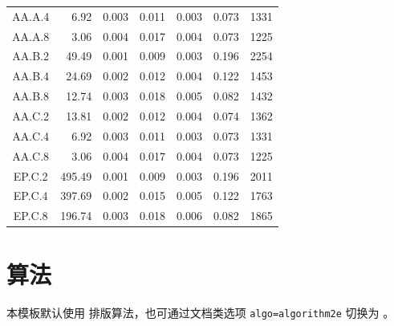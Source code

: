 \begin{ThreePartTable}
\begin{longtable}[c]{@{\extracolsep{\fill}}c*{6}{r}}
    AA.A.4                 & 6.92                                & 0.003                               & 0.011          & 0.003 & 0.073 & 1331   \\
    AA.A.8                 & 3.06                                & 0.004                               & 0.017          & 0.004 & 0.073 & 1225   \\
    AA.B.2                 & 49.49                               & 0.001                               & 0.009          & 0.003 & 0.196 & 2254   \\
    AA.B.4                 & 24.69                               & 0.002                               & 0.012          & 0.004 & 0.122 & 1453   \\
    AA.B.8                 & 12.74                               & 0.003                               & 0.018          & 0.005 & 0.082 & 1432   \\
    AA.C.2                 & 13.81                               & 0.002                               & 0.012          & 0.004 & 0.074 & 1362   \\
    AA.C.4                 & 6.92                                & 0.003                               & 0.011          & 0.003 & 0.073 & 1331   \\
    AA.C.8                 & 3.06                                & 0.004                               & 0.017          & 0.004 & 0.073 & 1225   \\
    EP.C.2                 & 495.49                              & 0.001                               & 0.009          & 0.003 & 0.196 & 2011   \\
    EP.C.4                 & 397.69                              & 0.002                               & 0.015          & 0.005 & 0.122 & 1763   \\
    EP.C.8                 & 196.74                              & 0.003                               & 0.018          & 0.006 & 0.082 & 1865   \\
    \bottomrule
  \end{longtable}
\end{ThreePartTable}



\section{算法}\label{sec:algorithm}

本模板默认使用  排版算法，也可通过文档类选项 \texttt{algo=algorithm2e} 切换为 。

